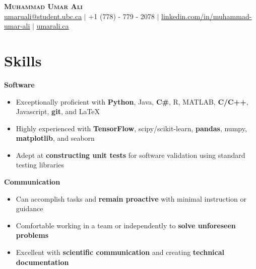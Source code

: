 \documentclass[letterpaper,11pt]{article}
\newcommand{\resumeItemListStart}{\begin{itemize}}
\newcommand{\resumeItemListEnd}{\end{itemize}\vspace{-5pt}}
\newcommand\bbold[1]{\textcolor{primay}{\textbf{#1}}}
\newcommand\bunderline[1]{\textcolor{primay}{\underline{#1}}}
\begin{document}

\begin{center}
    \bbold{\LARGE \scshape Muhammad Umar Ali} \\ \vspace{1pt}
    \href{mailto:umaruali@student.ubc.ca}{\bunderline{umaruali@student.ubc.ca}} $|$ \small +1 (778) - 779 - 2078 $|$ 
    \href{https://www.linkedin.com/in/muhammad-umar-ali/}{\bunderline{linkedin.com/in/muhammad-umar-ali}} $|$
    \href{https://umarali.ca/}{\bunderline{umarali.ca}}
\end{center}

\section{Skills}\vspace{-14pt}

\begin{multicols}{2}
    \textbf{Software}\vspace{-8pt}\begin{itemize}
    \setlength\itemsep{-2pt}
        \item\small{Exceptionally proficient with \textbf{Python}, Java, \textbf{C\#}, R, MATLAB, \textbf{C/C++}, Javascript, \textbf{git}, and \LaTeX}
        \item\small{Highly experienced with \textbf{TensorFlow}, scipy/scikit-learn, \textbf{pandas}, numpy, \textbf{matplotlib}, and seaborn}
        \item\small{Adept at \textbf{constructing unit tests} for software validation using standard testing libraries}
        \end{itemize}\vspace{-5pt}
    \textbf{Communication}\vspace{-8pt}\begin{itemize}
    \setlength\itemsep{-2pt}
        \item\small{Can accomplish tasks and \textbf{remain proactive} with minimal instruction or guidance}
        \item\small{Comfortable working in a team or independently to \textbf{solve unforeseen problems}}
        \item\small{Excellent with \textbf{scientific communication} and creating \textbf{technical documentation}}
    \end{itemize}\vspace{-5pt}
\end{multicols}\vspace{-15pt}
\end{document}
